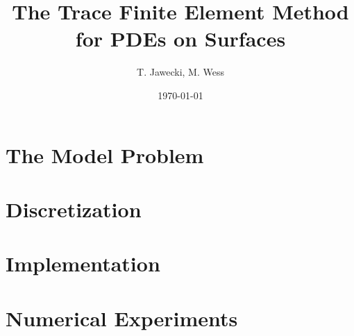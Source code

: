 \documentclass[11pt]{article}
\title{\textbf{The Trace Finite Element Method for PDEs on Surfaces}}
\author{T. Jawecki, M. Wess}
\date{\today}
\theoremstyle{plain}
\theoremstyle{definition}
\theoremstyle{remark}
\begin{document}
\maketitle

\section{The Model Problem}

\section{Discretization}

\section{Implementation}

\section{Numerical Experiments}
\end{document}
